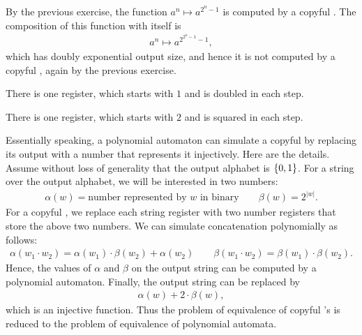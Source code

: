    {
By the previous exercise, the function $a^n \mapsto a^{2^n-1}$ is computed by a copyful \sst. The composition of this function with itself is
\begin{align*}
a^n \mapsto a^{2^{2^n-1}-1},
\end{align*}
which has doubly exponential output size, and hence it is not computed by a copyful \sst, again by the previous exercise.
}

   { There is one register, which starts with $1$ and is doubled in each step. }

     { There is one register, which starts with $2$ and is squared in each step. }


{

Essentially speaking, a polynomial automaton can simulate a copyful \sst by replacing its output with a number that represents it injectively.  Here are the details.
Assume without loss of generality that the output alphabet is $\{0,1\}$. For a string over the output alphabet, we will be interested in two numbers: 
\begin{align*}
\alpha(w) = \text{number represented by $w$ in binary} \qquad \beta(w) = 2^{|w|}.
\end{align*}
For a copyful \sst, we replace each string register with two number registers that store the above two numbers. We can simulate concatenation polynomially as follows: 
\begin{align*}
\alpha(w_1 \cdot w_2) = \alpha(w_1) \cdot \beta(w_2) + \alpha(w_2) \qquad \beta(w_1 \cdot w_2) = \beta(w_1) \cdot \beta(w_2).
\end{align*}
Hence, the values of $\alpha$ and $\beta$ on the output string can be computed by a polynomial automaton. Finally, the output string can be replaced by 
\begin{align*}
\alpha(w) + 2 \cdot \beta(w),
\end{align*}
which is an injective function. Thus the problem of equivalence of copyful \sst's is reduced to the problem of equivalence of polynomial automata.
}